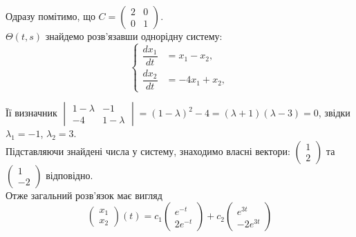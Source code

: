 \begin{solution}
    Одразу помітимо, що $C=\begin{pmatrix}2&0\\0&1\end{pmatrix}$.\\

    $\Theta(t,s)$ знайдемо розв'язавши однорідну систему:
    \begin{equation*}
        \left\{
        \begin{aligned}
        \dfrac{dx_1}{dt} &= x_1 - x_2, \\
        \dfrac{dx_2}{dt} &= -4x_1 + x_2,
        \end{aligned}
        \right.
    \end{equation*}
    
    Її визначник $\begin{vmatrix} 1 - \lambda & - 1 \\ - 4 & 1 - \lambda \end{vmatrix} = (1 - \lambda)^2 - 4 = (\lambda + 1) (\lambda - 3) = 0$, звідки $\lambda_1 = -1$, $\lambda_2 = 3$. \\
    
    Підставляючи знайдені числа у систему, знаходимо власні вектори: $\begin{pmatrix} 1 \\ 2 \end{pmatrix}$ та $\begin{pmatrix} 1 \\ -2 \end{pmatrix}$ відповідно. \\

    Отже загальний розв'язок має вигляд \[\begin{pmatrix} x_1 \\ x_2 \end{pmatrix}(t) = c_1 \begin{pmatrix} e^{-t} \\ 2e^{-t} \end{pmatrix} + c_2 \begin{pmatrix} e^{3t} \\ -2e^{3t} \end{pmatrix}\]
    

\end{solution}
